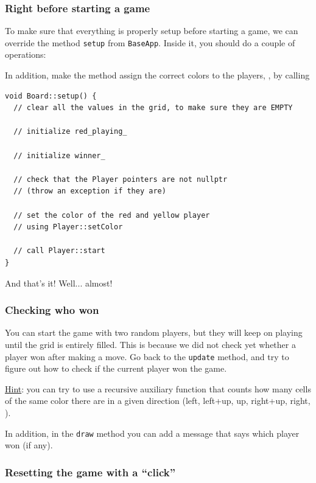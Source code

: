 \documentclass{article}
\begin{document}
\subsubsection{Right before starting a game}

To make sure that everything is properly setup before starting a game, we can override the method \texttt{setup} from \texttt{BaseApp}. Inside it, you should do a couple of operations:

In addition, make the method assign the correct colors to the players, \eg, by calling \begin{center}
\begin{minipage}{.9\textwidth}
\begin{lstlisting}[style=mycpp,numbers=none]
void Board::setup() {
  // clear all the values in the grid, to make sure they are EMPTY
  
  // initialize red_playing_
  
  // initialize winner_
  
  // check that the Player pointers are not nullptr
  // (throw an exception if they are)
  
  // set the color of the red and yellow player
  // using Player::setColor
  
  // call Player::start
}
\end{lstlisting}
\end{minipage}
\end{center}

And that's it! Well... almost!


\subsubsection{Checking who won}

You can start the game with two random players, but they will keep on playing until the grid is entirely filled. This is because we did not check yet whether a player won after making a move. Go back to the \texttt{update} method, and try to figure out how to check if the current player won the game.

\underline{Hint}: you can try to use a recursive auxiliary function that counts how many cells of the same color there are in a given direction (left, left+up, up, right+up, right, \etc).

In addition, in the \texttt{draw} method you can add a message that says which player won (if any).




\subsubsection{Resetting the game with a ``click''}\label{sec:reset_game}
\end{document}
